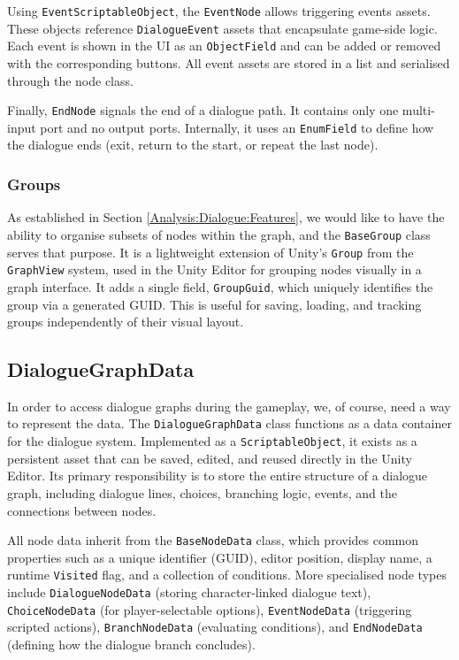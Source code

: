 Using \verb|EventScriptableObject|, the \verb|EventNode| allows triggering events assets. These objects reference \verb|DialogueEvent| assets that encapsulate game-side logic. Each event is shown in the UI as an \verb|ObjectField| and can be added or removed with the corresponding buttons. All event assets are stored in a list and serialised through the node class.

Finally, \verb|EndNode| signals the end of a dialogue path. It contains only one multi-input port and no output ports. Internally, it uses an \verb|EnumField| to define how the dialogue ends (exit, return to the start, or repeat the last node). 
 

\subsubsection{Groups}
As established in Section \ref{Analysis:Dialogue:Features}, we would like to have the ability to organise subsets of nodes within the graph, and the \verb|BaseGroup| class serves that purpose. It is a lightweight extension of Unity’s \verb|Group| from the \verb|GraphView| system, used in the Unity Editor for grouping nodes visually in a graph interface. It adds a single field, \verb|GroupGuid|, which uniquely identifies the group via a generated GUID. This is useful for saving, loading, and tracking groups independently of their visual layout.


\subsection{DialogueGraphData}
\label{devlog:DialogueGraphData}
In order to access dialogue graphs during the gameplay, we, of course, need a way to represent the data. The \verb|DialogueGraphData| class functions as a data container for the dialogue system. Implemented as a \verb|ScriptableObject|, it exists as a persistent asset that can be saved, edited, and reused directly in the Unity Editor. Its primary responsibility is to store the entire structure of a dialogue graph, including dialogue lines, choices, branching logic, events, and the connections between nodes.

All node data inherit from the \verb|BaseNodeData| class, which provides common properties such as a unique identifier (GUID), editor position, display name, a runtime \verb|Visited| flag, and a collection of conditions. More specialised node types include \verb|DialogueNodeData| (storing character-linked dialogue text), \verb|ChoiceNodeData| (for player-selectable options), \verb|EventNodeData| (triggering scripted actions), \verb|BranchNodeData| (evaluating conditions), and \verb|EndNodeData| (defining how the dialogue branch concludes).

